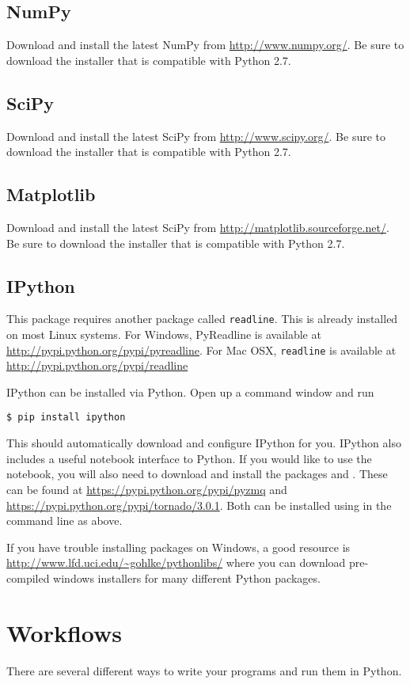 \subsection*{NumPy}
Download and install the latest NumPy from \url{http://www.numpy.org/}.
Be sure to download the installer that is compatible with Python 2.7.

\subsection*{SciPy}
Download and install the latest SciPy from \url{http://www.scipy.org/}.
Be sure to download the installer that is compatible with Python 2.7.

\subsection*{Matplotlib}
Download and install the latest SciPy from \url{http://matplotlib.sourceforge.net/}.
Be sure to download the installer that is compatible with Python 2.7.

\subsection*{IPython}
This package requires another package called \texttt{readline}.
This is already installed on most Linux systems.
For Windows, PyReadline is available at \url{http://pypi.python.org/pypi/pyreadline}.
For Mac OSX, \texttt{readline} is available at
\url{http://pypi.python.org/pypi/readline}

IPython can be installed via Python.
Open up a command window and run
\begin{lstlisting}
$ pip install ipython
\end{lstlisting}
This should automatically download and configure IPython for you.
IPython also includes a useful notebook interface to Python.
If you would like to use the notebook, you will also need to download and install
the packages  and .
These can be found at \url{https://pypi.python.org/pypi/pyzmq} and
\url{https://pypi.python.org/pypi/tornado/3.0.1}.
Both can be installed using  in the command line as above.

If you have trouble installing packages on Windows, a good resource is
\url{http://www.lfd.uci.edu/~gohlke/pythonlibs/} where you can download pre-compiled
windows installers for many different Python packages.

\section*{Workflows}
There are several different ways to write your programs and run them in Python.

